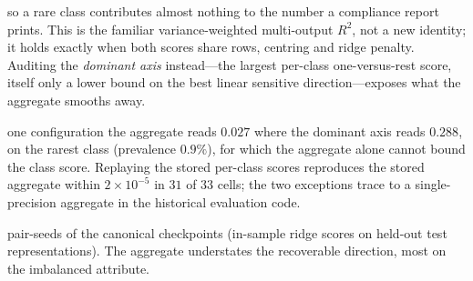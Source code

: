so a rare class contributes almost nothing to the number a compliance report prints. This is the
familiar variance-weighted multi-output $R^2$, not a new identity; it holds exactly when both scores share
rows, centring and ridge penalty. Auditing the \emph{dominant axis} instead---the largest per-class
one-versus-rest score, itself only a lower bound on the best linear sensitive direction---exposes what the
aggregate smooths away.

one configuration the aggregate reads $0.027$ where the dominant axis reads $0.288$, on the rarest
class (prevalence $0.9\%$), for which the aggregate alone cannot bound the class score. Replaying the
stored per-class scores reproduces the stored aggregate within $2\times10^{-5}$ in $31$ of $33$ cells; the
two exceptions trace to a single-precision aggregate in the historical evaluation code.

pair-seeds of the canonical checkpoints (in-sample ridge scores on held-out test representations). The
aggregate understates the recoverable direction, most on the imbalanced attribute.
